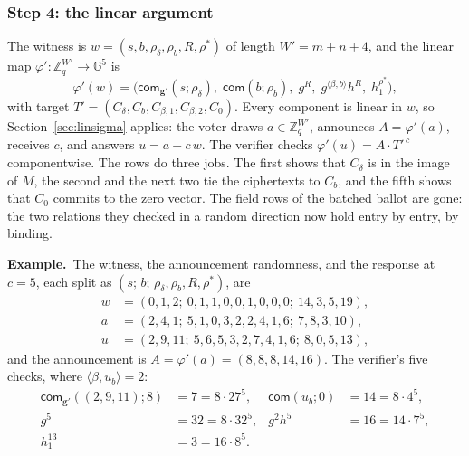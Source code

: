 \documentclass[11pt,a4paper]{article}
\newcommand{\G}{\mathbb{G}}
\newcommand{\Z}{\mathbb{Z}}
\newcommand{\com}{\mathsf{com}}
\newcommand{\ex}[1]{\par\medskip\noindent\textbf{Example.}~#1\par\medskip}
\theoremstyle{remark}
\begin{document}
\subsubsection*{Step 4: the linear argument}
The witness is $w = (s, b, \rho_\delta, \rho_b, R, \rho^*)$ of length $W'
= m + n + 4$, and the linear map $\varphi' : \Z_q^{W'} \to \G^{5}$ is
\[
  \varphi'(w) = \big(\com_{\mathbf{g}'}(s; \rho_\delta),\;
  \com(b; \rho_b),\; g^{R},\; g^{\langle \beta, b \rangle} h^{R},\;
  h_1^{\rho^*}\big),
\]
with target $T' = (C_\delta, C_b, C_{\beta,1}, C_{\beta,2}, C_0)$. Every
component is linear in $w$, so Section~\ref{sec:linsigma} applies: the voter
draws $a \in \Z_q^{W'}$, announces $A = \varphi'(a)$, receives $c$, and
answers $u = a + c\,w$. The verifier checks $\varphi'(u) = A \cdot
T'^{\,c}$ componentwise. The rows do three jobs. The first shows that
$C_\delta$ is in the image of $M$, the second and the next two tie the
ciphertexts to $C_b$, and the fifth shows that $C_0$ commits to the zero
vector. The field rows of the batched ballot are gone: the two relations
they checked in a random direction now hold entry by entry, by binding.

\ex{The witness, the announcement randomness, and the response at $c =
5$, each split as $(s;\, b;\, \rho_\delta, \rho_b, R, \rho^*)$, are
\begin{align*}
  w &= (0, 1, 2;\ 0, 1, 1, 0, 0, 1, 0, 0, 0;\ 14, 3, 5, 19),\\
  a &= (2, 4, 1;\ 5, 1, 0, 3, 2, 2, 4, 1, 6;\ 7, 8, 3, 10),\\
  u &= (2, 9, 11;\ 5, 6, 5, 3, 2, 7, 4, 1, 6;\ 8, 0, 5, 13),
\end{align*}
and the announcement is $A = \varphi'(a) = (8, 8, 8, 14, 16)$. The verifier's five checks, where
$\langle \beta, u_b \rangle = 2$:
\begin{align*}
  \com_{\mathbf{g}'}((2, 9, 11); 8) &= 7 = 8 \cdot 27^{5}, &
  \com(u_b; 0) &= 14 = 8 \cdot 4^{5}, \\
  g^{5} &= 32 = 8 \cdot 32^{5}, &
  g^{2} h^{5} &= 16 = 14 \cdot 7^{5}, \\
  h_1^{13} &= 3 = 16 \cdot 8^{5}.
\end{align*}}
\end{document}
